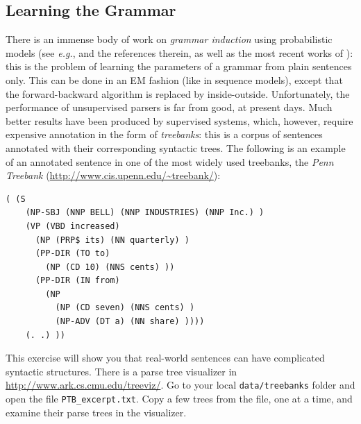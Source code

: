\subsection{Learning the Grammar}

There is an immense body of work on \emph{grammar induction} using probabilistic models (see \emph{e.g.}, \citet{Manning1999} 
and the references therein, as well as the most recent works of \citet{Klein2002,Smith2005,Cohen2008}): this is the problem of 
learning the parameters of a grammar from plain sentences only. This can be done in an EM fashion (like in sequence models), 
except that the forward-backward algorithm is replaced by inside-outside. 
Unfortunately, the performance of unsupervised parsers is far from good, at present days. 
Much better results have been produced by supervised systems, which, however, require expensive annotation in the form of 
\emph{treebanks}: this is a corpus of sentences annotated with their corresponding syntactic trees. 
The following is an example of an annotated sentence in one of the most widely used treebanks, the \emph{Penn Treebank} 
(\url{http://www.cis.upenn.edu/~treebank/}): 

\begin{verbatim}
( (S
    (NP-SBJ (NNP BELL) (NNP INDUSTRIES) (NNP Inc.) )
    (VP (VBD increased)
      (NP (PRP$ its) (NN quarterly) )
      (PP-DIR (TO to)
        (NP (CD 10) (NNS cents) ))
      (PP-DIR (IN from)
        (NP
          (NP (CD seven) (NNS cents) )
          (NP-ADV (DT a) (NN share) ))))
    (. .) ))
\end{verbatim}

\begin{exercise}\label{exer:treebank}
This exercise will show you that real-world sentences can have complicated syntactic structures. 
There is a parse tree visualizer in \url{http://www.ark.cs.cmu.edu/treeviz/}. 
Go to your local {\tt data/treebanks} folder and open the file {\tt PTB\_excerpt.txt}. 
Copy a few trees from the file, one at a time, and examine their parse trees in the visualizer.  
\end{exercise}

